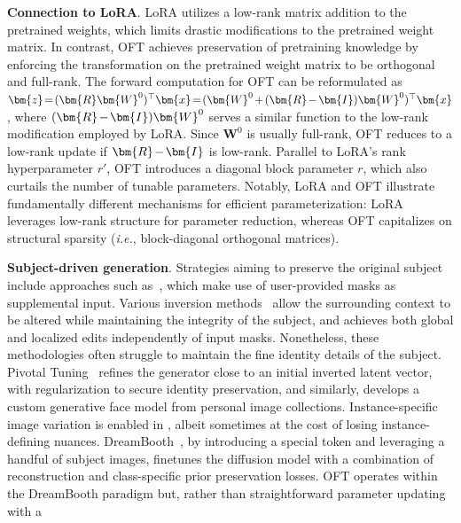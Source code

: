 \textbf{Connection to LoRA}. LoRA utilizes a low-rank matrix addition to the pretrained weights, which limits drastic modifications to the pretrained weight matrix. In contrast, OFT achieves preservation of pretraining knowledge by enforcing the transformation on the pretrained weight matrix to be orthogonal and full-rank. The forward computation for OFT can be reformulated as $\thickmuskip=2mu \medmuskip=2mu \bm{z}=(\bm{R}\bm{W}^0)^\top\bm{x}=(\bm{W}^0+(\bm{R}-\bm{I})\bm{W}^0)^\top\bm{x}$, where $\thickmuskip=2mu \medmuskip=2mu (\bm{R}-\bm{I})\bm{W}^0$ serves a similar function to the low-rank modification employed by LoRA. Since $\bm{W}^0$ is usually full-rank, OFT reduces to a low-rank update if $\thickmuskip=2mu \medmuskip=2mu \bm{R}-\bm{I}$ is low-rank. Parallel to LoRA's rank hyperparameter $r'$, OFT introduces a diagonal block parameter $r$, which also curtails the number of tunable parameters. Notably, LoRA and OFT illustrate fundamentally different mechanisms for efficient parameterization: LoRA leverages low-rank structure for parameter reduction, whereas OFT capitalizes on structural sparsity (\emph{i.e.}, block-diagonal orthogonal matrices).

\textbf{Subject-driven generation}. Strategies aiming to preserve the original subject include approaches such as~\cite{avrahami2022blended,nichol2022glide}, which make use of user-provided masks as supplemental input. Various inversion methods~\cite{choi2021ilvr,dhariwal2021diffusion,ramesh2022hierarchical,gal2022image} allow the surrounding context to be altered while maintaining the integrity of the subject, and \cite{hertz2022prompt} achieves both global and localized edits independently of input masks. Nonetheless, these methodologies often struggle to maintain the fine identity details of the subject. Pivotal Tuning~\cite{roich2022pivotal} refines the generator close to an initial inverted latent vector, with regularization to secure identity preservation, and similarly, \cite{nitzan2022mystyle} develops a custom generative face model from personal image collections. Instance-specific image variation is enabled in \cite{casanova2021instance}, albeit sometimes at the cost of losing instance-defining nuances. DreamBooth~\cite{ruiz2023dreambooth}, by introducing a special token and leveraging a handful of subject images, finetunes the diffusion model with a combination of reconstruction and class-specific prior preservation losses. OFT operates within the DreamBooth paradigm but, rather than straightforward parameter updating with a

